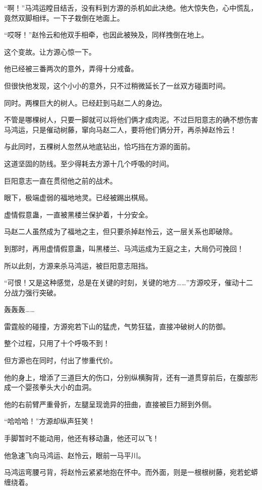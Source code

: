 \begin{this_body}
“啊！”马鸿运瞠目结舌，没有料到方源的杀机如此决绝。他大惊失色，心中慌乱，竟然双脚相绊。一下子栽倒在地面上。

“哎呀！”赵怜云和他双手相牵，也因此被殃及，同样拽倒在地上。

这个变故。让方源心惊一下。

他已经被三番两次的意外，弄得十分戒备。

但很快他发现，这个小小的意外，只不过稍微延长了一丝双方碰面时间。

同时。两棵巨大的树人。已经赶到马赵二人的身边。

不管是哪棵树人，只要一脚就可以将他们俩才成肉泥。不过巨阳意志的确不想伤害马鸿运，只是催动树藤，窜向马赵二人，要将他们俩分开，再杀掉赵怜云！

与此同时，五棵树人忽然从地底钻出，恰巧挡在方源的面前。

这道坚固的防线。至少得耗去方源十几个呼吸的时间。

巨阳意志一直在贯彻他之前的战术。

眼下，极端虚弱的福地地灵。已经被踢出棋局。

虚情假意蛊，一直被黑楼兰保护着，十分安全。

马赵二人虽然成为了福地之主，但只要杀掉赵怜云，这一层关系也即破除。

到那时，再用虚情假意蛊，叫黑楼兰、马鸿运成为王庭之主，大局仍可挽回！

所以此刻，方源来杀马鸿运，被巨阳意志阻挡。

“可恨！又是这种感觉，总是在关键的时刻，关键的地方……”方源咬牙，催动十二分战力强行突破。

轰轰轰……

雷霆般的碰撞，方源宛若下山的猛虎，气势狂猛，直接冲破树人的防御。

整个过程，只用了十个呼吸不到！

但方源也在同时，付出了惨重代价。

他的身上，增添了三道巨大的伤口，分别纵横胸背，还有一道贯穿前后，在腹部形成一个婴孩拳头大小的血洞。

他的右前臂严重骨折，左腿呈现诡异的扭曲，直接被巨力掰到外侧。

“哈哈哈！”方源却纵声狂笑！

手脚暂时不能动用，他还有移动蛊，他还可以飞！

他急速飞向马鸿运、赵怜云，眼前一马平川。

马鸿运弯腰弓背，将赵怜云紧紧地抱在怀中。而外面，则是一根根树藤，宛若蛇蟒缠绕着。


\end{this_body}
